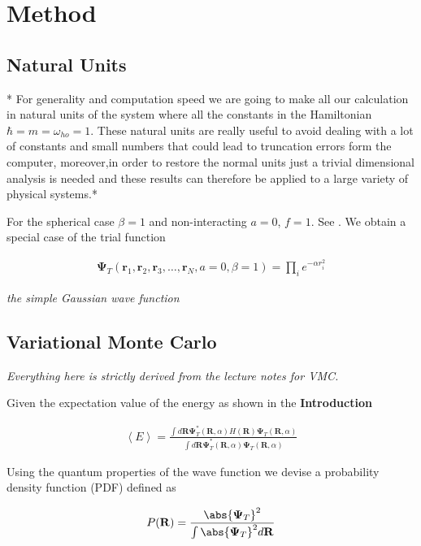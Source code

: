 \section{Method}

\subsection{Natural Units}
* For generality and computation speed we are going to make all our calculation in natural units of the system where all the constants in the Hamiltonian $\hbar = m = \omega_{ho} = 1 $.  These natural units are really useful to avoid dealing with a lot of constants and small numbers that could lead to truncation errors form the computer, moreover,in  order  to  restore  the  normal  units  just  a  trivial  dimensional  analysis  is  needed  and  these  results  can  therefore  be applied to a large variety of physical systems.*

For the spherical case $\beta = 1$ and non-interacting $a=0$, $f= 1$. See \href{}{\color{blue}{GITHUB PROJECT}}. We obtain a special case of the trial function

\begin{align}
    \mathbf{\Psi}_T \left( \mathbf{r}_1, \mathbf{r}_2, \mathbf{r}_3, \dots, \mathbf{r}_N, a= 0 , \beta = 1  \right)  = \prod_i e^{-\alpha r_i^2}
\end{align}

\textit{the simple Gaussian wave function}

\subsection{Variational Monte Carlo}
\textit{Everything here is strictly derived from the lecture notes \cite{VMC} for VMC.}

Given the expectation value of the energy as shown in the \textbf{Introduction}

\begin{align}
    \left\langle E \right\rangle = \frac{\int d\mathbf{R} \mathbf{\Psi}_T^*(\mathbf{R},\alpha) H(\mathbf{R}) \mathbf{\Psi}_T(\mathbf{R},\alpha)}{\int d\mathbf{R} \mathbf{\Psi}_T^*(\mathbf{R},\alpha)\mathbf{\Psi}_T(\mathbf{R},\alpha)}
    \label{eq:energy-expectation-value-2}
\end{align}

Using the quantum properties of the wave function we devise a probability density function (PDF) defined as

\begin{align}
    P(\mathbf{R}) = \frac{ \abs{\mathbf{\Psi}_T}^2 }{ \int \abs{\mathbf{\Psi}_T}^2 d\mathbf{R} }
\end{align}

